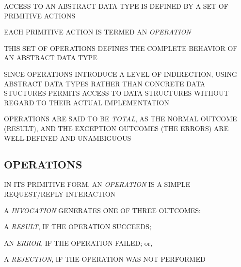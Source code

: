 \begin{bwslide}

\begin{nrtc}
\item	ACCESS TO AN ABSTRACT DATA TYPE IS DEFINED BY A SET OF PRIMITIVE
	ACTIONS

\item	EACH PRIMITIVE ACTION IS TERMED AN \emph{OPERATION}

\item	THIS SET OF OPERATIONS DEFINES THE COMPLETE BEHAVIOR OF AN ABSTRACT
	DATA TYPE
\end{nrtc}
\end{bwslide}


\begin{bwslide}

\begin{nrtc}
\item	SINCE OPERATIONS INTRODUCE A LEVEL OF INDIRECTION,
	USING ABSTRACT DATA TYPES RATHER THAN CONCRETE DATA STUCTURES
	PERMITS ACCESS TO DATA STRUCTURES WITHOUT REGARD TO THEIR ACTUAL
	IMPLEMENTATION

\item	OPERATIONS ARE SAID TO BE \emph{TOTAL}, AS THE NORMAL OUTCOME (RESULT),
	AND THE EXCEPTION OUTCOMES (THE ERRORS) ARE WELL-DEFINED AND
	UNAMBIGUOUS
\end{nrtc}
\end{bwslide}


\begin{bwslide}
\part*	{OPERATIONS}\bf

\begin{nrtc}
\item	IN ITS PRIMITIVE FORM,
	AN \emph{OPERATION} IS A SIMPLE REQUEST/REPLY INTERACTION

\item	A \emph{INVOCATION} GENERATES ONE OF THREE OUTCOMES:
    \begin{nrtc}
    \item	A \emph{RESULT}, IF THE OPERATION SUCCEEDS;

    \item	AN \emph{ERROR}, IF THE OPERATION FAILED; or,

    \item	A \emph{REJECTION}, IF THE OPERATION WAS NOT PERFORMED
    \end{nrtc}
\end{nrtc}
\end{bwslide}


